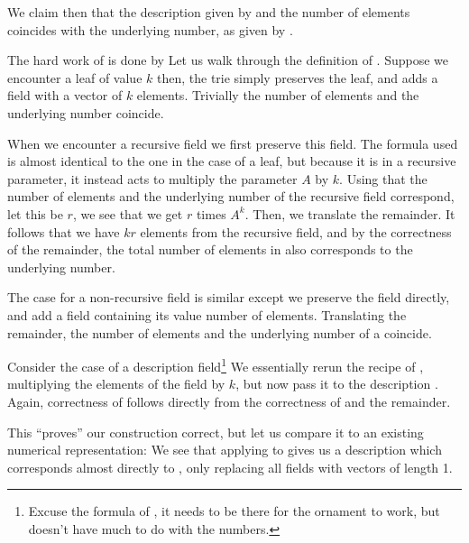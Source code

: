 \begin{conjecture}
    We claim then that the description given by
    and the number of elements coincides with the underlying number, as given by .
\end{conjecture}
The hard work of  is done by
Let us walk through the definition of . Suppose we encounter a leaf of value $k$
then, the trie simply preserves the leaf, and adds a field with a vector of $k$ elements. Trivially the number of elements and the underlying number coincide.

When we encounter a recursive field
we first preserve this field. The formula used is almost identical to the one in the case of a leaf, but because it is in a recursive parameter, it instead acts to multiply the parameter $A$ by $k$. Using that the number of elements and the underlying number of the recursive field correspond, let this be $r$, we see that we get $r$ times $A^k$. Then, we translate the remainder. It follows that we have $kr$ elements from the recursive field, and by the correctness of the remainder, the total number of elements in  also corresponds to the underlying number.

The case for a non-recursive field is similar
except we preserve the field directly, and add a field containing its value number of elements. Translating the remainder, the number of elements and the underlying number of a  coincide.

Consider the case of a description field\footnote{Excuse the formula of , it needs to be there for the ornament to work, but doesn't have much to do with the numbers.}
We essentially rerun the recipe of , multiplying the elements of the field by $k$, but now pass it to the description . Again, correctness of  follows directly from the correctness of  and the remainder.


\begin{example}
    
\end{example}
This ``proves'' our construction correct, but let us compare it to an existing numerical representation:
We see that applying  to  gives us a description which corresponds almost directly to , only replacing all fields with vectors of length 1.

